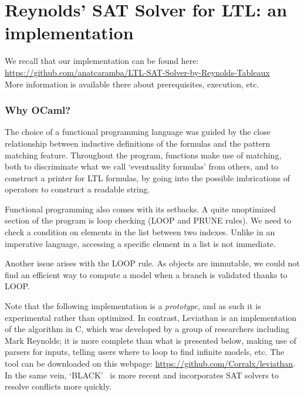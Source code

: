 \documentclass[11pt]{article}
\def\CC{{C\nolinebreak[4]\hspace{-.05em}\raisebox{.4ex}{\tiny\bf ++}}}
\theoremstyle{definition}
\begin{document}
\section{Reynolds' SAT Solver for LTL: an implementation}\label{SecOcaml}

We recall that our implementation can be found here:\\

\href{https://github.com/anatcaramba/LTL-SAT-Solver-by-Reynolds-Tableaux}{https://github.com/anatcaramba/LTL-SAT-Solver-by-Reynolds-Tableaux}\\

More information is available there about prerequisites, execution, etc.

\subsubsection*{Why OCaml?}
The choice of a functional programming language was guided by the close relationship
between inductive definitions of the formulas and the pattern matching feature.
Throughout the program, functions make use of matching, both to discriminate
what we call `eventuality formulas' from others, and to construct a printer
for LTL formulas, by going into the possible imbrications of operators to construct
a readable string.

Functional programming also comes with its setbacks. A quite unoptimized section of 
the program is loop checking (LOOP and PRUNE rules). We need to check a condition on 
elements in the list between two indexes. Unlike in an imperative language, accessing
a specific element in a list is not immediate. 

Another issue arises with the LOOP rule. As objects 
are immutable, we could not find an efficient way to compute a model when a branch is
validated thanks to LOOP. 

Note that the following implementation is a \emph{prototype}, and as such it is 
experimental rather than optimized. In contrast, Leviathan \cite{Leviathan}
is an implementation of the algorithm in \CC, which was developed by a group of researchers including Mark Reynolds;
it is more complete than what is presented below, making use of parsers for inputs,
telling users where to loop to find infinite models, etc. The tool can be downloaded on this webpage: 
\href{https://github.com/Corralx/leviathan}{https://github.com/Corralx/leviathan}.
In the same vein, `BLACK'~\cite{Black21} is more recent and incorporates SAT solvers to resolve conflicts more quickly.
    
\end{document}
